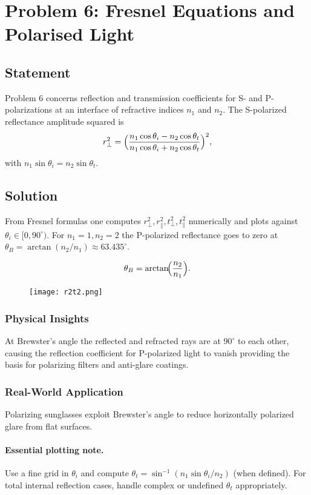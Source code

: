 \documentclass[12pt,a4paper]{article}
\newcommand{\bluebox}[1]{\begin{tcolorbox}#1\end{tcolorbox}}
\newcommand{\n}{\ensuremath{n}}
\begin{document}
\section{Problem 6: Fresnel Equations and Polarised Light}
\subsection*{Statement }
Problem 6 concerns reflection and transmission coefficients for S- and P-polarizations at an interface of refractive indices $\n_1$ and $\n_2$. The S-polarized reflectance amplitude squared is
\[
r_\perp^2=\Bigl(\frac{\n_1\cos\theta_i-\n_2\cos\theta_t}{\n_1\cos\theta_i+\n_2\cos\theta_t}\Bigr)^2,
\]
with $\n_1\sin\theta_i=\n_2\sin\theta_t$.

\subsection*{Solution}
From Fresnel formulas one computes $r_\perp^2,r_\parallel^2,t_\perp^2,t_\parallel^2$ numerically and plots against $\theta_i\in[0,90^\circ)$. For $\n_1=1,\n_2=2$ the P-polarized reflectance goes to zero at $\theta_B=\arctan(\n_2/\n_1)\approx 63.435^\circ$.

\bluebox{\[
\theta_B=\arctan\!\Bigl(\frac{\n_2}{\n_1}\Bigr).
\]}
\begin{figure}
  \texttt{[image: r2t2.png]}
\end{figure}
\subsubsection*{Physical Insights}
At Brewster's angle the reflected and refracted rays are at $90^\circ$ to each other, causing the reflection coefficient for P-polarized light to vanish providing the basis for polarizing filters and anti-glare coatings.

\subsubsection*{Real-World Application}
Polarizing sunglasses exploit Brewster's angle to reduce horizontally polarized glare from flat surfaces.

\paragraph{Essential plotting note.}
Use a fine grid in $\theta_i$ and compute $\theta_t=\sin^{-1}(\n_1\sin\theta_i/\n_2)$ (when defined). For total internal reflection cases, handle complex or undefined $\theta_t$ appropriately.
\end{document}
